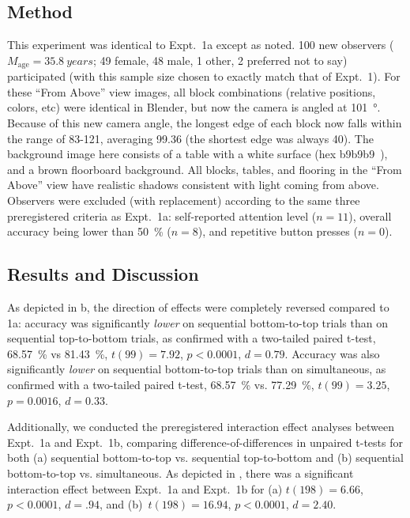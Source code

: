 \subsection{Method}
This experiment was identical to Expt.~1a except as noted.  100 new observers ($M_\text{age} = \qty{35.8}{years}$; 49 female, 48 male, 1 other, 2 preferred not to say) participated (with this sample size chosen to exactly match that of Expt.~1).  For these “From Above” view images, all block combinations (relative positions, colors, etc) were identical in Blender, but now the camera is angled at \qty{101}{\degree}.  Because of this new camera angle, the longest edge of each block now falls within the range of 83-\qty{121}{\pixel}, averaging \qty{99.36}{\pixel} (the shortest edge was always \qty{40}{\pixel}).  The background image here consists of a table with a white surface (hex b9b9b9~), and a brown floorboard background.  All blocks, tables, and flooring in the “From Above” view have realistic shadows consistent with light coming from above.  Observers were excluded (with replacement) according to the same three preregistered criteria as Expt.~1a: self-reported attention level ($n=11$), overall accuracy being lower than \qty{50}{\percent} ($n=8$), and repetitive button presses ($n = 0$).

\subsection{Results and Discussion}
As depicted in b, the direction of effects were completely reversed compared to 1a: accuracy was significantly \textit{lower} on sequential bottom-to-top trials than on sequential top-to-bottom trials, as confirmed with a two-tailed paired t-test, \qty{68.57}{\percent} vs \qty{81.43}{\percent}, $t(99) = 7.92$, $p < 0.0001$, $d = 0.79$.  Accuracy was also significantly \textit{lower} on sequential bottom-to-top trials than on simultaneous, as confirmed with a two-tailed paired t-test, \qty{68.57}{\percent} vs. \qty{77.29}{\percent}, $t(99) = 3.25$, $p = 0.0016$, $d = 0.33$.

Additionally, we conducted the preregistered interaction effect analyses between Expt.~1a and Expt.~1b, comparing difference-of-differences in unpaired t-tests for both (a) sequential bottom-to-top vs. sequential top-to-bottom and (b) sequential bottom-to-top vs. simultaneous.  As depicted in , there was a significant interaction effect between Expt.~1a and Expt.~1b for (a) $t(198) = 6.66$, $p < 0.0001$, $d = .94$, and (b)~$t(198) = 16.94$, $p < 0.0001$, $d = 2.40$.

